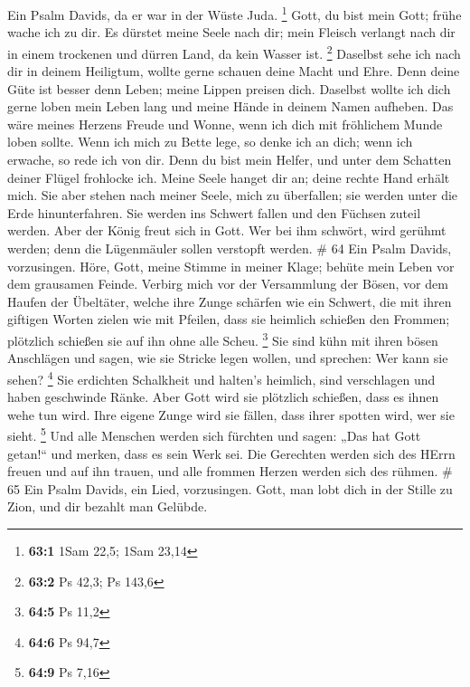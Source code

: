  Ein Psalm Davids, da er war in der Wüste Juda. \footnote{\textbf{63:1}
  1Sam 22,5; 1Sam 23,14}  Gott, du bist mein Gott; frühe
wache ich zu dir. Es dürstet meine Seele nach dir; mein Fleisch verlangt
nach dir in einem trockenen und dürren Land, da kein Wasser ist.
\footnote{\textbf{63:2} Ps 42,3; Ps 143,6}  Daselbst sehe
ich nach dir in deinem Heiligtum, wollte gerne schauen deine Macht und
Ehre.  Denn deine Güte ist besser denn Leben; meine Lippen
preisen dich.  Daselbst wollte ich dich gerne loben mein
Leben lang und meine Hände in deinem Namen aufheben.  Das
wäre meines Herzens Freude und Wonne, wenn ich dich mit fröhlichem Munde
loben sollte.  Wenn ich mich zu Bette lege, so denke ich an
dich; wenn ich erwache, so rede ich von dir.  Denn du bist
mein Helfer, und unter dem Schatten deiner Flügel frohlocke ich.
 Meine Seele hanget dir an; deine rechte Hand erhält mich.
 Sie aber stehen nach meiner Seele, mich zu überfallen; sie
werden unter die Erde hinunterfahren.  Sie werden ins
Schwert fallen und den Füchsen zuteil werden.  Aber der
König freut sich in Gott. Wer bei ihm schwört, wird gerühmt werden; denn
die Lügenmäuler sollen verstopft werden. \# 64  Ein Psalm
Davids, vorzusingen.  Höre, Gott, meine Stimme in meiner
Klage; behüte mein Leben vor dem grausamen Feinde.  Verbirg
mich vor der Versammlung der Bösen, vor dem Haufen der Übeltäter,
 welche ihre Zunge schärfen wie ein Schwert, die mit ihren
giftigen Worten zielen wie mit Pfeilen,  dass sie heimlich
schießen den Frommen; plötzlich schießen sie auf ihn ohne alle Scheu.
\footnote{\textbf{64:5} Ps 11,2}  Sie sind kühn mit ihren
bösen Anschlägen und sagen, wie sie Stricke legen wollen, und sprechen:
Wer kann sie sehen? \footnote{\textbf{64:6} Ps 94,7}  Sie
erdichten Schalkheit und halten's heimlich, sind verschlagen und haben
geschwinde Ränke.  Aber Gott wird sie plötzlich schießen,
dass es ihnen wehe tun wird.  Ihre eigene Zunge wird sie
fällen, dass ihrer spotten wird, wer sie sieht. \footnote{\textbf{64:9}
  Ps 7,16}  Und alle Menschen werden sich fürchten und
sagen: „Das hat Gott getan!{}`` und merken, dass es sein Werk sei.
 Die Gerechten werden sich des HErrn freuen und auf ihn
trauen, und alle frommen Herzen werden sich des rühmen. \# 65
 Ein Psalm Davids, ein Lied, vorzusingen.  Gott,
man lobt dich in der Stille zu Zion, und dir bezahlt man Gelübde.
